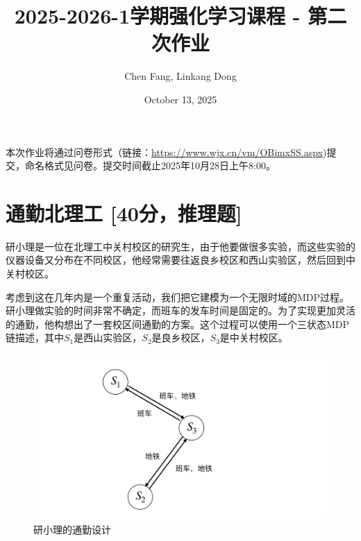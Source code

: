 \documentclass[a4paper,12pt]{article}
\title{2025-2026-1学期强化学习课程 - 第二次作业}
\author{Chen Fang, Linkang Dong}
\date{October 13, 2025}
\begin{document}
\maketitle

本次作业将通过问卷形式（链接：\url{https://www.wjx.cn/vm/OBimxSS.aspx})提交，命名格式见问卷。提交时间截止2025年10月28日上午8:00。
\section{通勤北理工 [40分，推理题]}

研小理是一位在北理工中关村校区的研究生，由于他要做很多实验，而这些实验的仪器设备又分布在不同校区，他经常需要往返良乡校区和西山实验区，然后回到中关村校区。

考虑到这在几年内是一个重复活动，我们把它建模为一个无限时域的MDP过程。研小理做实验的时间非常不确定，而班车的发车时间是固定的。为了实现更加灵活的通勤，他构想出了一套校区间通勤的方案。这个过程可以使用一个三状态MDP链描述，其中$S_1$是西山实验区，$S_2$是良乡校区，$S_3$是中关村校区。

\begin{figure}[h]
    \centering
    \includegraphics[width=0.5\linewidth]{Q1.pdf}
    \caption{研小理的通勤设计}
    \label{fig:Q1}
\end{figure}
\end{document}
